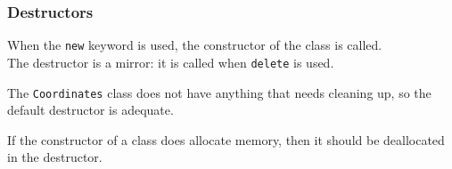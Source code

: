 \begin{frame}
\frametitle{Destructors}

When the \texttt{new} keyword is used, the constructor of the class is called.\\
\quad The destructor is a mirror: it is called when \texttt{delete} is used.

The \texttt{Coordinates} class does not have anything that needs cleaning up, so the default destructor is adequate.

If the constructor of a class does allocate memory, then it should be deallocated in the destructor. 


\end{frame}




